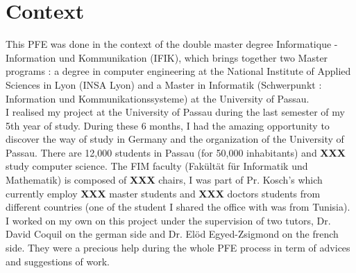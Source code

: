 \section{Context}
This PFE was done in the context of the double master degree Informatique - Information und Kommunikation (IFIK), which brings together two Master programs : a degree in computer engineering at the National Institute of Applied Sciences in Lyon (INSA Lyon) and a Master in Informatik (Schwerpunkt : Information und Kommunikationssysteme) at the University of Passau.\\

I realised my project at the University of Passau during the last semester of my 5th year of study. During these 6 months, I had the amazing opportunity to discover the way of study in Germany and the organization of the University of Passau. There are 12,000 students in Passau (for 50,000 inhabitants) and \textbf{XXX} study computer science. The FIM faculty (Fakültät für Informatik und Mathematik) is composed of \textbf{XXX} chairs, I was part of Pr. Kosch's which currently employ \textbf{XXX} master students and \textbf{XXX} doctors students from different countries (one of the student I shared the office with was from Tunisia).\\

I worked on my own on this project under the supervision of two tutors, Dr. David Coquil on the german side and Dr. Elöd Egyed-Zsigmond on the french side. They were a precious help during the whole PFE process in term of advices and suggestions of work.